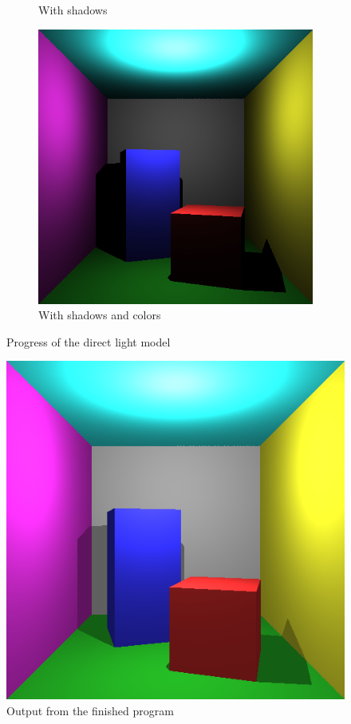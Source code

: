 \documentclass[a4paper,11pt]{article}
\begin{document}
\begin{figure}[h!]
\begin{subfigure}[h!]{0.3\linewidth}
		\caption{With shadows}
		\label{fig3}
	\end{subfigure}
	\begin{subfigure}[h!]{0.3\linewidth}
		\centering
		\includegraphics[width=\linewidth]{screenshot3.png}
		\caption{With shadows and colors}
		\label{fig4}
	\end{subfigure}
	\caption{Progress of the direct light model}
\end{figure}

\begin{figure}[h!]
	\centering	
	\includegraphics[width=0.45\linewidth]{screenshot4.png}
	\caption{Output from the finished program}
	\label{fig5}
\end{figure}
\end{document}

